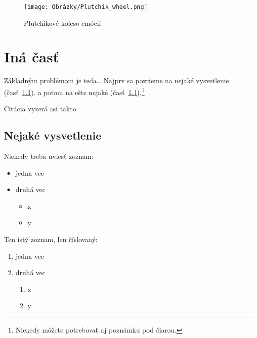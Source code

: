 \documentclass[10pt,twoside,slovak,a4paper]{article}
\begin{document}

\begin{figure}[H]
		\centering
		\texttt{[image: Obrázky/Plutchik\_wheel.png]}
		\caption{Plutchikové koleso emócií}
		\label{fig:EWheel}
\end{figure}



\section{Iná časť}\label{ina}

Základným problémom je teda\ldots{} Najprv sa pozrieme na nejaké vysvetlenie (časť~\ref{ina:nejake}), a potom na ešte nejaké (časť~\ref{ina:nejake}).\footnote{Niekedy môžete potrebovať aj poznámku pod čiarou.}

Citácia vyzerá asi takto~\cite{Bicalho2020}
\subsection{Nejaké vysvetlenie}\label{ina:nejake}

Niekedy treba uviesť zoznam:

\begin{itemize}
\item jedna vec
\item druhá vec
	\begin{itemize}
	\item x
	\item y
	\end{itemize}
\end{itemize}

Ten istý zoznam, len číslovaný:

\begin{enumerate}
\item jedna vec
\item druhá vec
	\begin{enumerate}
	\item x
	\item y
	\end{enumerate}
\end{enumerate}
\end{document}

